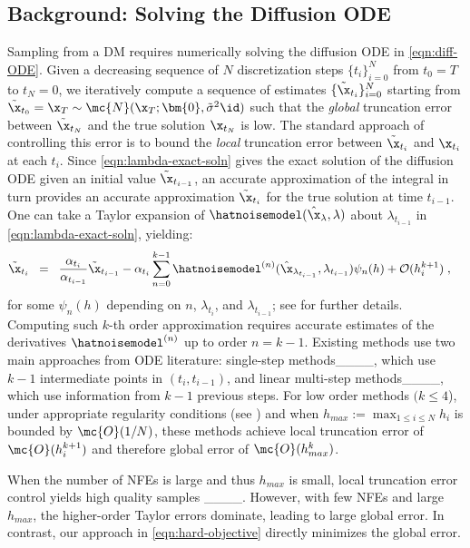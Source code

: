 \subsection{Background: Solving the Diffusion ODE}\label{sec:background-diff-ode}
Sampling from a DM requires numerically solving the diffusion ODE in \eqref{eqn:diff-ODE}.
Given a decreasing sequence of $N$ discretization steps $\{t_i\}_{i=0}^N$ from $t_0=T$ to $t_N=0$, we iteratively compute a sequence of estimates $\{\tilde \x_{t_i}\}_{i=0}^N$ starting from $\tilde \x_{t_0}=\x_T\sim \mc{N}(\x_T;\bm{0}, \tilde\sigma^2\id)$ such that the \emph{global} truncation error between $\tilde \x_{t_N}$ and the true solution $\x_{t_N}$ is low.
The standard approach of controlling this error is to bound the \emph{local} truncation error between $\tilde \x_{t_i}$ and $\x_{t_i}$ at each $t_i$.
Since \eqref{eqn:lambda-exact-soln} gives the exact solution of the diffusion ODE given an initial value $\tilde\x_{t_{i-1}}$, an accurate approximation of the integral in turn provides an accurate approximation $\tilde \x_{t_i}$ for the true solution at time $t_{i-1}$.
One can take a Taylor expansion of $\hatnoisemodel(\hat\x_\lambda,\lambda)$ about $\lambda_{t_{i-1}}$ in \eqref{eqn:lambda-exact-soln}, yielding:
\begin{align}
\tilde\x_{t_i} \;\; = \;\; \frac{\alpha_{t_i}}{\alpha_{t_{i-1}}} \tilde{\x}_{t_{i-1}} 
   - \alpha_{t_i} \sum_{n=0}^{k-1} \hatnoisemodel^{(n)}(&\hat{\x}_{\lambda_{t_{i-1}}}, \lambda_{t_{i-1}}) \psi_n(h)  
   + \mathcal{O}(h_i^{k+1})\;, \label{eqn:lambda-taylor-soln}
\end{align}
for some $\psi_n(h)$ depending on $n$, $\lambda_{t_i}$, and $\lambda_{t_{i-1}}$; see  for further details.
Computing such $k$-th order approximation requires accurate estimates of the derivatives $\hatnoisemodel^{(n)}$ up to order $n=k-1$. 
Existing methods use two main approaches from ODE literature: single-step methods____, which use $k-1$ intermediate points in $(t_i, t_{i-1})$, and linear multi-step methods____, which use information from $k-1$ previous steps. 
For low order methods $(k\leq 4$), under appropriate regularity conditions (see ) and when $h_{max}:=\max_{1\leq i\leq N} h_i$ is bounded by $\mc{O}(1/N)$, these methods achieve local truncation error of $\mc{O}(h_i^{k+1})$ and therefore global error of $\mc{O}(h_{max}^k)$.

When the number of NFEs is large and thus $h_{max}$ is small, local truncation error control yields high quality samples   
____. 
However, with few NFEs and large $h_{max}$, the higher-order Taylor errors dominate, leading to large global error.
In contrast, our approach in \eqref{eqn:hard-objective} directly minimizes the global error.

